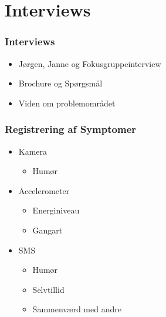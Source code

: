 \section{Interviews}

\begin{frame}
\frametitle{Interviews}
\begin{itemize}
	\item Jørgen, Janne og Fokusgruppeinterview
	\item Brochure og Spørgsmål
	\item Viden om problemområdet
\end{itemize}
\end{frame}

\begin{frame}
\frametitle{Registrering af Symptomer}
\begin{itemize}
	\item Kamera
	\begin{itemize}
		\item Humør
	\end{itemize}
	\item Accelerometer
	\begin{itemize}
		\item Energiniveau
		\item Gangart
	\end{itemize}
	\item SMS
	\begin{itemize}
		\item Humør
		\item Selvtillid
		\item Sammenværd med andre
	\end{itemize}
\end{itemize}
\end{frame}

